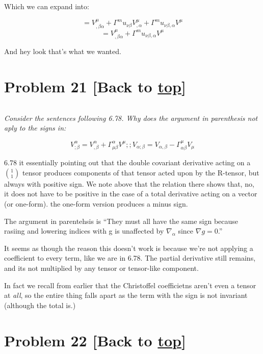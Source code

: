 \documentclass[landscape,letterpaper,10pt,english]{article}
\begin{document}
    Which we can expand into:

\[ = V^\mu_{,\beta\alpha} + \Gamma^mu_{\nu\beta}V^\mu_{,\alpha} +  \Gamma^mu_{\nu\beta,\alpha}V^\mu \]
\[ = V^\mu_{,\beta\alpha} + \Gamma^mu_{\nu\beta,\alpha}V^\mu \]

And hey look that's what we wanted.

    \hypertarget{problem-21-back-to-top}{%
\section{\texorpdfstring{Problem 21 {[}Back to
\hyperref[toc]{top}{]}}{Problem 21 {[}Back to {]}}}\label{problem-21-back-to-top}}

\[\label{P21}\]

\emph{Consider the sentences following 6.78. Why does the argument in
parenthesis not aply to the signs in:}

\[ V^\alpha_{;\beta} = V^\alpha_{,\beta} + \Gamma^\alpha_{\mu\beta} V^\mu ;; V_{\alpha;\beta} = V_{\alpha,\beta} - \Gamma^\mu_{\alpha\beta} V_\mu\]

    6.78 it essentially pointing out that the double covariant derivative
acting on a \(1\choose1\) tensor produces components of that tensor
acted upon by the R-tensor, but always with positive sign. We note above
that the relation there shows that, no, it does not have to be positive
in the case of a total derivative acting on a vector (or one-form). the
one-form version produces a minus sign.

The argument in parentehsis is ``They must all have the same sign
because rasiing and lowering indices with g is unaffected by
\(\nabla_\alpha\) since \(\nabla g = 0\).''

It seems as though the reason this doesn't work is because we're not
applying a coefficient to every term, like we are in 6.78. The partial
derivative still remains, and its not multiplied by any tensor or
tensor-like component.

In fact we recall from earlier that the Christoffel coefficietns aren't
even a tensor at \emph{all}, so the entire thing falls apart as the term
with the sign is not invariant (although the total is.)

    \hypertarget{problem-22-back-to-top}{%
\section{\texorpdfstring{Problem 22 {[}Back to
\hyperref[toc]{top}{]}}{Problem 22 {[}Back to {]}}}\label{problem-22-back-to-top}}
\end{document}
